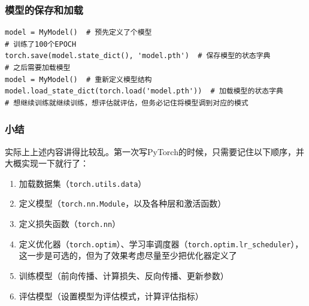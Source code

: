 \documentclass{ctexbeamer}
\begin{document}
\begin{frame}[fragile]
    \frametitle{模型的保存和加载}

    \begin{verbatim}
model = MyModel()  # 预先定义了个模型
# 训练了100个EPOCH
torch.save(model.state_dict(), 'model.pth')  # 保存模型的状态字典
# 之后需要加载模型
model = MyModel()  # 重新定义模型结构
model.load_state_dict(torch.load('model.pth'))  # 加载模型的状态字典
# 想继续训练就继续训练，想评估就评估，但务必记住将模型调到对应的模式
    \end{verbatim}

\end{frame}

\begin{frame}[fragile]
    \frametitle{小结}
    实际上上述内容讲得比较乱。第一次写PyTorch的时候，只需要记住以下顺序，并大概实现一下就行了：

    \begin{enumerate}
            \item 加载数据集（\texttt{torch.utils.data}）
            \item 定义模型（\texttt{torch.nn.Module}，以及各种层和激活函数）
            \item 定义损失函数（\texttt{torch.nn}）
            \item 定义优化器（\texttt{torch.optim}）、学习率调度器（\texttt{torch.optim.lr_scheduler}），这一步是可选的，但为了效果考虑尽量至少把优化器定义了
        \item 训练模型（前向传播、计算损失、反向传播、更新参数）
        \item 评估模型（设置模型为评估模式，计算评估指标）
    \end{enumerate}

\end{frame}





\end{document}
